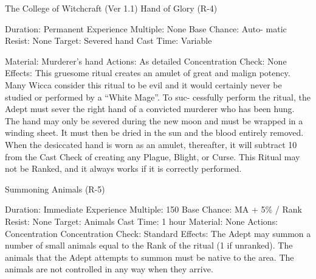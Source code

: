 \begin{Chapter}{The College of Witchcraft (Ver 1.1)}
Hand of Glory (R-4) 

Duration: Permanent 
Experience  Multiple:  None  Base  Chance:  Auto-
matic 
Resist: None 
Target: Severed hand 
Cast Time: Variable 

Material: Murderer’s hand 
Actions: As detailed 
Concentration Check: None 
Effects:  This  gruesome  ritual  creates  an  amulet  of 
great  and  malign  potency.  Many  Wicca  consider 
this ritual to be evil and it would certainly never be 
studied  or  performed  by  a  “White Mage”.  To  suc-
cessfully  perform  the  ritual,  the  Adept  must  sever 
the  right  hand  of  a  convicted  murderer  who  has 
been  hung.  The  hand  may  only  be  severed  during 
the  new  moon  and  must  be  wrapped  in  a  winding 
sheet. It must then be dried in the sun and the blood 
entirely  removed.  When  the  desiccated  hand  is 
worn  as  an  amulet,  thereafter,  it  will  subtract  10 
from  the  Cast  Check  of  creating  any  Plague, 
Blight,  or  Curse.  This  Ritual  may  not  be  Ranked, 
and it always works if it is correctly performed. 

Summoning Animals (R-5) 

Duration: Immediate 
Experience Multiple: 150 
Base Chance: MA + 5\% / Rank 
Resist: None 
Target: Animals 
Cast Time: 1 hour 
Material: None 
Actions: Concentration 
Concentration Check: Standard 
Effects:  The  Adept  may  summon  a  number  of 
small  animals  equal  to  the  Rank  of  the  ritual  (1  if 
unranked).  The animals that  the  Adept  attempts to 
summon  must  be  native  to  the  area.  The  animals 
are not controlled in any way when they arrive. 

\end{Chapter}
